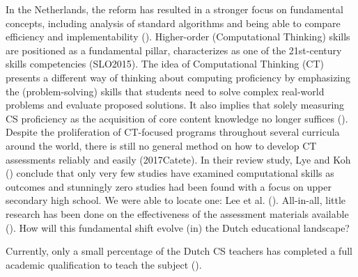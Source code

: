 In the Netherlands, the reform has resulted in a stronger focus on fundamental concepts, including analysis of standard algorithms and being able to compare efficiency and implementability (\cite{Barendsen2016}). Higher-order (Computational Thinking) skills are positioned as a fundamental pillar, characterizes as one of the 21st-century skills competencies (SLO2015). The idea of Computational Thinking (CT) presents a different way of thinking about computing proficiency by emphasizing the (problem-solving) skills that students need to solve complex real-world problems and evaluate proposed solutions. It also implies that solely measuring CS proficiency as the acquisition of core content knowledge no longer suffices (\cite{Yadav2015}). Despite the proliferation of CT-focused programs throughout several curricula around the world, there is still no general method on how to develop CT assessments reliably and easily (2017Catete). In their review study, Lye and Koh (\cite{LyeKoh2014}) conclude that only very few studies have examined computational skills as outcomes and stunningly zero studies had been found with a focus on upper secondary high school. We were able to locate one: Lee et al. (\cite{Lee2011}). All-in-all, little research has been done on the effectiveness of the assessment materials available (\cite{Yadav2016}).
How will this fundamental shift evolve (in) the Dutch educational landscape?




Currently, only a small percentage of the Dutch CS teachers has completed a full academic qualification to teach the subject (\cite{tolboom2014informatica}).

